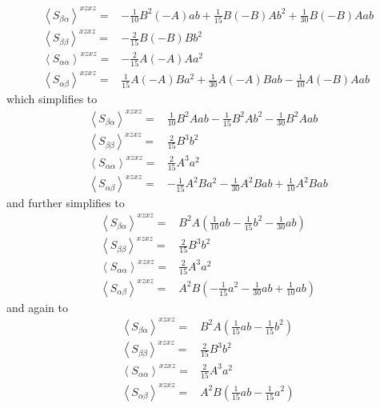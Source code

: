\begin{align*}
	\left \langle S_{\beta \alpha} \right \rangle^{xzxz} =&    -\frac{1}{10} B^2 (-A)  a b  +  \frac{1}{15} B (- B) A  b^2+ \frac{1}{30} B (- B) A a b  \\
	\left \langle S_{\beta \beta} \right \rangle^{xzxz} =&   -\frac{2}{15} B (- B) B b^2\\
	\left \langle S_{\alpha \alpha} \right \rangle^{xzxz} =& - \frac{2}{15} A (-A) A a^2  \\
	\left \langle S_{\alpha \beta} \right \rangle^{xzxz} =&   \frac{1}{15} A (-A) B a^2   + \frac{1}{30} A (-A) B a b -\frac{1}{10} A (-B) A a b
\end{align*}
which simplifies to
\begin{align*}
	\left \langle S_{\beta \alpha} \right \rangle^{xzxz} =&    \frac{1}{10} B^2 A  a b  -  \frac{1}{15} B^2A  b^2 - \frac{1}{30} B^2 A a b  \\
	\left \langle S_{\beta \beta} \right \rangle^{xzxz} =&   \frac{2}{15} B^3 b^2\\
	\left \langle S_{\alpha \alpha} \right \rangle^{xzxz} =& \frac{2}{15} A^3  a^2  \\
	\left \langle S_{\alpha \beta} \right \rangle^{xzxz} =&   -\frac{1}{15} A^2 B a^2   - \frac{1}{30} A^2 B a b + \frac{1}{10} A^2 B a b
\end{align*}
and further simplifies to
\begin{align*}
	\left \langle S_{\beta \alpha} \right \rangle^{xzxz} =&   B^2 A \left( \frac{1}{10}   a b  -  \frac{1}{15}   b^2 - \frac{1}{30}  a b \right) \\
	\left \langle S_{\beta \beta} \right \rangle^{xzxz} =&   \frac{2}{15} B^3 b^2\\
	\left \langle S_{\alpha \alpha} \right \rangle^{xzxz} =& \frac{2}{15} A^3  a^2  \\
	\left \langle S_{\alpha \beta} \right \rangle^{xzxz} =& A^2 B \left(  -\frac{1}{15}  a^2   - \frac{1}{30} a b + \frac{1}{10}  a b   \right)
\end{align*}
and again to
\begin{align*}
	\left \langle S_{\beta \alpha} \right \rangle^{xzxz} =&   B^2 A \left( \frac{1}{15}   a b  -  \frac{1}{15}   b^2 \right) \\
	\left \langle S_{\beta \beta} \right \rangle^{xzxz} =&   \frac{2}{15} B^3 b^2\\
	\left \langle S_{\alpha \alpha} \right \rangle^{xzxz} =& \frac{2}{15} A^3  a^2  \\
	\left \langle S_{\alpha \beta} \right \rangle^{xzxz} =& A^2 B \left(\frac{1}{15}  a b   -\frac{1}{15}  a^2    \right)
\end{align*}
